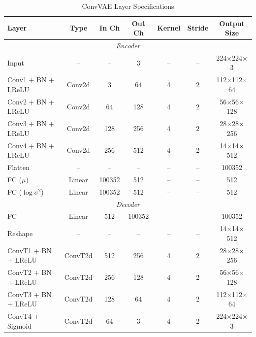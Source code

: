 \documentclass[11pt,a4paper]{article}
\begin{document}
\begin{table}[H]
    \centering
    \caption{ConvVAE Layer Specifications}
    \label{tab:convvae-layers}
    \begin{tabular}{lcccccc}
        \toprule
        \textbf{Layer} & \textbf{Type} & \textbf{In Ch} & \textbf{Out Ch} & \textbf{Kernel} & \textbf{Stride} & \textbf{Output Size} \\
        \midrule
        \multicolumn{7}{c}{\textit{Encoder}} \\
        \midrule
        Input & -- & -- & 3 & -- & -- & 224$\times$224$\times$3 \\
        Conv1 + BN + LReLU & Conv2d & 3 & 64 & 4 & 2 & 112$\times$112$\times$64 \\
        Conv2 + BN + LReLU & Conv2d & 64 & 128 & 4 & 2 & 56$\times$56$\times$128 \\
        Conv3 + BN + LReLU & Conv2d & 128 & 256 & 4 & 2 & 28$\times$28$\times$256 \\
        Conv4 + BN + LReLU & Conv2d & 256 & 512 & 4 & 2 & 14$\times$14$\times$512 \\
        Flatten & -- & -- & -- & -- & -- & 100352 \\
        FC ($\mu$) & Linear & 100352 & 512 & -- & -- & 512 \\
        FC ($\log\sigma^2$) & Linear & 100352 & 512 & -- & -- & 512 \\
        \midrule
        \multicolumn{7}{c}{\textit{Decoder}} \\
        \midrule
        FC & Linear & 512 & 100352 & -- & -- & 100352 \\
        Reshape & -- & -- & -- & -- & -- & 14$\times$14$\times$512 \\
        ConvT1 + BN + LReLU & ConvT2d & 512 & 256 & 4 & 2 & 28$\times$28$\times$256 \\
        ConvT2 + BN + LReLU & ConvT2d & 256 & 128 & 4 & 2 & 56$\times$56$\times$128 \\
        ConvT3 + BN + LReLU & ConvT2d & 128 & 64 & 4 & 2 & 112$\times$112$\times$64 \\
        ConvT4 + Sigmoid & ConvT2d & 64 & 3 & 4 & 2 & 224$\times$224$\times$3 \\
        \bottomrule
    \end{tabular}
\end{table}

\end{document}
